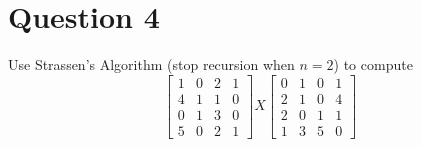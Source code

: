 \documentclass{article}
\begin{document}
  \pagebreak
  \section{Question 4}
  Use Strassen's Algorithm (stop recursion when $n = 2$) to compute
  \[
  	\begin{bmatrix}
  		1 & 0 & 2 & 1 \\
  		4 & 1 & 1 & 0 \\
  		0 & 1 & 3 & 0 \\
  		5 & 0 & 2 & 1
  	\end{bmatrix}
  	X
  	\begin{bmatrix}
  	0 & 1 & 0 & 1 \\
  	2 & 1 & 0 & 4 \\
  	2 & 0 & 1 & 1 \\
  	1 & 3 & 5 & 0
  	\end{bmatrix}
  \]
\end{document}

